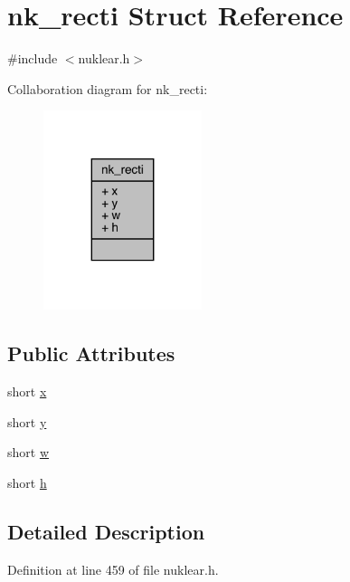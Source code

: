 \hypertarget{structnk__recti}{}\section{nk\+\_\+recti Struct Reference}
\label{structnk__recti}


{\ttfamily \#include $<$nuklear.\+h$>$}



Collaboration diagram for nk\+\_\+recti\+:
\nopagebreak
\begin{figure}[H]
\begin{center}
\leavevmode
\includegraphics[width=131pt]{structnk__recti__coll__graph}
\end{center}
\end{figure}
\subsection*{Public Attributes}
\begin{DoxyCompactItemize}
\item 
short \mbox{\hyperlink{structnk__recti_a97e89bfa91f1359ad07e3d40a0f26082}{x}}
\item 
short \mbox{\hyperlink{structnk__recti_a59bdabc718f54615256de8026399a518}{y}}
\item 
short \mbox{\hyperlink{structnk__recti_a3ad6451540db2a5f50fa003a3a0ffbde}{w}}
\item 
short \mbox{\hyperlink{structnk__recti_a347aa6882ebcdc51a94bb80a049d302c}{h}}
\end{DoxyCompactItemize}


\subsection{Detailed Description}


Definition at line 459 of file nuklear.\+h.



